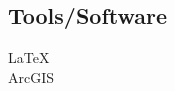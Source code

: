 \documentclass[]{deedy-resume-reversed}
\begin{document}
\begin{minipage}[t]{0.33\textwidth}
\subsection{Tools/Software}
LaTeX \\
ArcGIS


%






\end{minipage}
\end{document}
